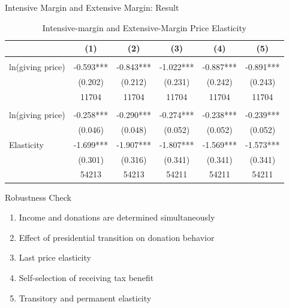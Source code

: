 \documentclass[
  ignorenonframetext,
]{beamer}
\providecommand{\tightlist}{%
  \setlength{\itemsep}{0pt}\setlength{\parskip}{0pt}}
\begin{document}
\begin{frame}{Intensive Margin and Extensive Margin: Result}
\protect\hypertarget{intensive-margin-and-extensive-margin-result}{}
\begin{table}

\caption{\label{tab:kableEstimateElasticityIntExt}Intensive-margin and Extensive-Margin Price Elasticity}
\centering
\fontsize{8}{10}\selectfont
\begin{tabular}[t]{lccccc}
\toprule
 & (1) & (2) & (3) & (4) & (5)\\
\midrule
\addlinespace[0.3em]
\multicolumn{6}{l}{\textbf{Intensive Margin}}\\
\hspace{1em}ln(giving price) & -0.593*** & -0.843*** & -1.022*** & -0.887*** & -0.891***\\
\hspace{1em} & (0.202) & (0.212) & (0.231) & (0.242) & (0.243)\\
\hspace{1em} & 11704 & 11704 & 11704 & 11704 & 11704\\
\addlinespace[0.3em]
\multicolumn{6}{l}{\textbf{Extensive Margin}}\\
\hspace{1em}ln(giving price) & -0.258*** & -0.290*** & -0.274*** & -0.238*** & -0.239***\\
\hspace{1em} & (0.046) & (0.048) & (0.052) & (0.052) & (0.052)\\
\hspace{1em}Elasticity & -1.699*** & -1.907*** & -1.807*** & -1.569*** & -1.573***\\
 & (0.301) & (0.316) & (0.341) & (0.341) & (0.341)\\
 & 54213 & 54213 & 54211 & 54211 & 54211\\
\bottomrule
\end{tabular}
\end{table}
\end{frame}

\begin{frame}{Robustness Check}
\protect\hypertarget{robustness-check}{}
\begin{enumerate}
\tightlist
\item
  Income and donations are determined simultaneously
\item
  Effect of presidential transition on donation behavior
\item
  Last price elasticity
\item
  Self-selection of receiving tax benefit
\item
  Transitory and permanent elasticity
\end{enumerate}
\end{frame}
\end{document}
